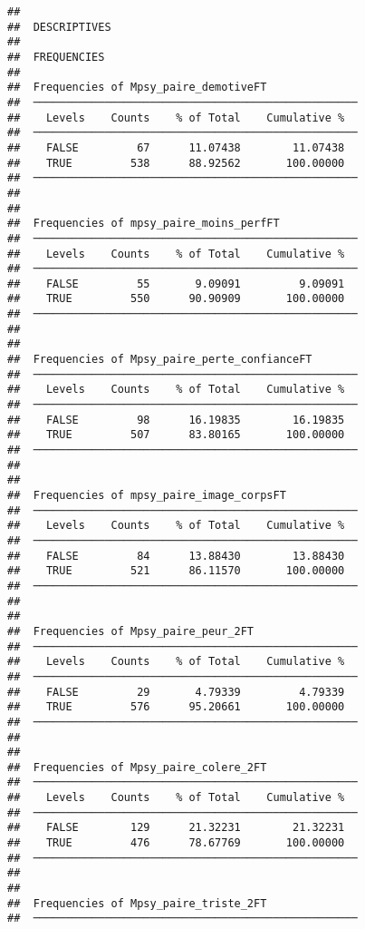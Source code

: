 \documentclass[
]{article}
\begin{document}
\begin{verbatim}
## 
##  DESCRIPTIVES
## 
##  FREQUENCIES
## 
##  Frequencies of Mpsy_paire_demotiveFT               
##  ────────────────────────────────────────────────── 
##    Levels    Counts    % of Total    Cumulative %   
##  ────────────────────────────────────────────────── 
##    FALSE         67      11.07438        11.07438   
##    TRUE         538      88.92562       100.00000   
##  ────────────────────────────────────────────────── 
## 
## 
##  Frequencies of mpsy_paire_moins_perfFT             
##  ────────────────────────────────────────────────── 
##    Levels    Counts    % of Total    Cumulative %   
##  ────────────────────────────────────────────────── 
##    FALSE         55       9.09091         9.09091   
##    TRUE         550      90.90909       100.00000   
##  ────────────────────────────────────────────────── 
## 
## 
##  Frequencies of Mpsy_paire_perte_confianceFT        
##  ────────────────────────────────────────────────── 
##    Levels    Counts    % of Total    Cumulative %   
##  ────────────────────────────────────────────────── 
##    FALSE         98      16.19835        16.19835   
##    TRUE         507      83.80165       100.00000   
##  ────────────────────────────────────────────────── 
## 
## 
##  Frequencies of mpsy_paire_image_corpsFT            
##  ────────────────────────────────────────────────── 
##    Levels    Counts    % of Total    Cumulative %   
##  ────────────────────────────────────────────────── 
##    FALSE         84      13.88430        13.88430   
##    TRUE         521      86.11570       100.00000   
##  ────────────────────────────────────────────────── 
## 
## 
##  Frequencies of Mpsy_paire_peur_2FT                 
##  ────────────────────────────────────────────────── 
##    Levels    Counts    % of Total    Cumulative %   
##  ────────────────────────────────────────────────── 
##    FALSE         29       4.79339         4.79339   
##    TRUE         576      95.20661       100.00000   
##  ────────────────────────────────────────────────── 
## 
## 
##  Frequencies of Mpsy_paire_colere_2FT               
##  ────────────────────────────────────────────────── 
##    Levels    Counts    % of Total    Cumulative %   
##  ────────────────────────────────────────────────── 
##    FALSE        129      21.32231        21.32231   
##    TRUE         476      78.67769       100.00000   
##  ────────────────────────────────────────────────── 
## 
## 
##  Frequencies of Mpsy_paire_triste_2FT               
##  ────────────────────────────────────────────────── 

\end{verbatim}
\end{document}
